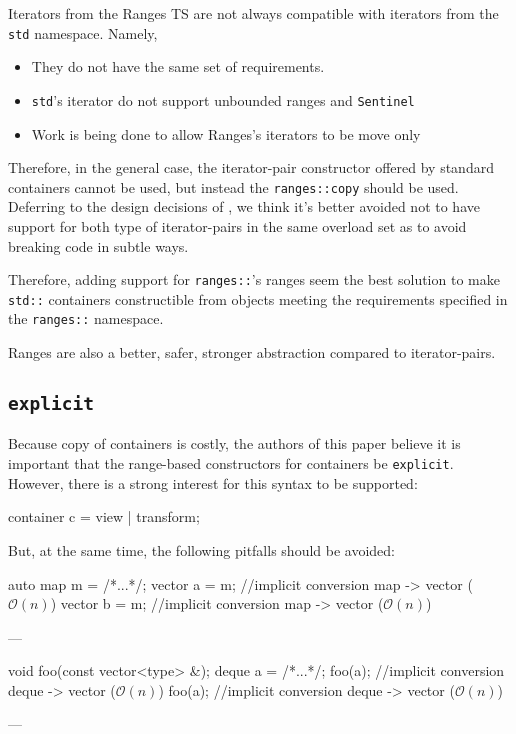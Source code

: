 \documentclass{wg21}
\newcommand{\cc}[1]{\texttt{#1}}
\begin{document}
Iterators from the Ranges TS are not always compatible with iterators from the \cc{std} namespace.
Namely,
\begin{itemize}
    \item They do not have the same set of requirements.
    \item \cc{std}'s iterator do not support unbounded ranges and \cc{Sentinel}
    \item Work is being done to allow Ranges's iterators to be move only
\end{itemize}

Therefore, in the general case, the iterator-pair constructor offered by standard containers cannot be used, but instead the \cc{ranges::copy} should be used.
Deferring to the design decisions of \cite{P0896R3}, we think it's better avoided not to have support for both type of iterator-pairs in the same overload set
as to avoid breaking code in subtle ways.

Therefore, adding support for \cc{ranges::}'s ranges seem the best solution to make \cc{std::} containers constructible from objects meeting the requirements
specified in the \cc{ranges::} namespace.

Ranges are also a better, safer, stronger abstraction compared to iterator-pairs.

\subsection{\cc{explicit}}

Because copy of containers is costly, the authors of this paper believe it is important that the range-based constructors for containers be \cc{explicit}.
However, there is a strong interest for this syntax to be supported:
\begin{codeblock}
    container c = view | transform;
\end{codeblock}

But, at the same time, the following pitfalls should be avoided:


\begin{codeblock}
    auto map m = /*...*/;
    vector a = m;  //implicit conversion map -> vector ($\mathcal{O}(n)$)
    vector b = m;  //implicit conversion map -> vector ($\mathcal{O}(n)$)
\end{codeblock}
---

\begin{codeblock}
    void foo(const vector<type> &);
    deque a =  /*...*/;
    foo(a);  //implicit conversion deque -> vector ($\mathcal{O}(n)$)
    foo(a);  //implicit conversion deque -> vector ($\mathcal{O}(n)$)
\end{codeblock}
---
\end{document}
